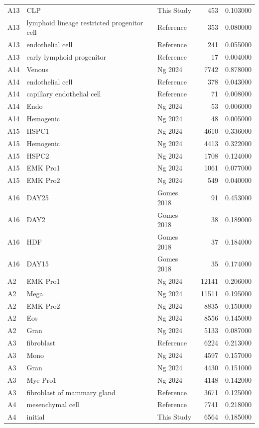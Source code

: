 \begin{longtable}{lllrr}
A13 & CLP & This Study & 453 & 0.103000 \\
A13 & lymphoid lineage restricted progenitor cell & Reference & 353 & 0.080000 \\
A13 & endothelial cell & Reference & 241 & 0.055000 \\
A13 & early lymphoid progenitor & Reference & 17 & 0.004000 \\
A14 & Venous & Ng 2024 & 7742 & 0.878000 \\
A14 & endothelial cell & Reference & 378 & 0.043000 \\
A14 & capillary endothelial cell & Reference & 71 & 0.008000 \\
A14 & Endo & Ng 2024 & 53 & 0.006000 \\
A14 & Hemogenic & Ng 2024 & 48 & 0.005000 \\
A15 & HSPC1 & Ng 2024 & 4610 & 0.336000 \\
A15 & Hemogenic & Ng 2024 & 4413 & 0.322000 \\
A15 & HSPC2 & Ng 2024 & 1708 & 0.124000 \\
A15 & EMK Pro1 & Ng 2024 & 1061 & 0.077000 \\
A15 & EMK Pro2 & Ng 2024 & 549 & 0.040000 \\
A16 & DAY25 & Gomes 2018 & 91 & 0.453000 \\
A16 & DAY2 & Gomes 2018 & 38 & 0.189000 \\
A16 & HDF & Gomes 2018 & 37 & 0.184000 \\
A16 & DAY15 & Gomes 2018 & 35 & 0.174000 \\
A2 & EMK Pro1 & Ng 2024 & 12141 & 0.206000 \\
A2 & Mega & Ng 2024 & 11511 & 0.195000 \\
A2 & EMK Pro2 & Ng 2024 & 8835 & 0.150000 \\
A2 & Eos & Ng 2024 & 8556 & 0.145000 \\
A2 & Gran & Ng 2024 & 5133 & 0.087000 \\
A3 & fibroblast & Reference & 6224 & 0.213000 \\
A3 & Mono & Ng 2024 & 4597 & 0.157000 \\
A3 & Gran & Ng 2024 & 4430 & 0.151000 \\
A3 & Mye Pro1 & Ng 2024 & 4148 & 0.142000 \\
A3 & fibroblast of mammary gland & Reference & 3671 & 0.125000 \\
A4 & mesenchymal cell & Reference & 7741 & 0.218000 \\
A4 & initial & This Study & 6564 & 0.185000 \\

\end{longtable}
